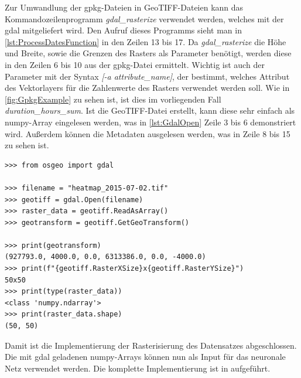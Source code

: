 Zur Umwandlung der \acrshort{gpkg}-Dateien in GeoTIFF-Dateien kann das Kommandozeilenprogramm \emph{gdal\_rasterize} verwendet werden, welches mit der \acrfull{gdal} mitgeliefert wird.
Den Aufruf dieses Programms sieht man in \autoref{lst:ProcessDatesFunction} in den Zeilen 13 bis 17.
Da \emph{gdal\_rasterize} die Höhe und Breite, sowie die Grenzen des Rasters als Parameter benötigt, werden diese in den Zeilen 6 bis 10 aus der \acrshort{gpkg}-Datei ermittelt.
Wichtig ist auch der Parameter mit der Syntax \emph{[-a attribute\_name]}, der bestimmt, welches Attribut des Vektorlayers für die Zahlenwerte des Rasters verwendet werden soll.
Wie in \autoref{fig:GpkgExample} zu sehen ist, ist dies im vorliegenden Fall \emph{duration\_hours\_sum}.
Ist die GeoTIFF-Datei erstellt, kann diese sehr einfach als numpy-Array eingelesen werden, was in \autoref{lst:GdalOpen} Zeile 3 bis 6 demonstriert wird.
Außerdem können die Metadaten ausgelesen werden, was in Zeile 8 bis 15 zu sehen ist.

\begin{code}
\begin{verbatim}
>>> from osgeo import gdal

>>> filename = "heatmap_2015-07-02.tif"
>>> geotiff = gdal.Open(filename)
>>> raster_data = geotiff.ReadAsArray()
>>> geotransform = geotiff.GetGeoTransform()

>>> print(geotransform)
(927793.0, 4000.0, 0.0, 6313386.0, 0.0, -4000.0)
>>> print(f"{geotiff.RasterXSize}x{geotiff.RasterYSize}")
50x50
>>> print(type(raster_data))
<class 'numpy.ndarray'>
>>> print(raster_data.shape)
(50, 50)
\end{verbatim}
\label{lst:GdalOpen}
\end{code}

Damit ist die Implementierung der Rasterisierung des Datensatzes abgeschlossen.
Die mit \acrshort{gdal} geladenen numpy-Arrays können nun als Input für das neuronale Netz verwendet werden.
Die komplette Implementierung ist in  aufgeführt.

